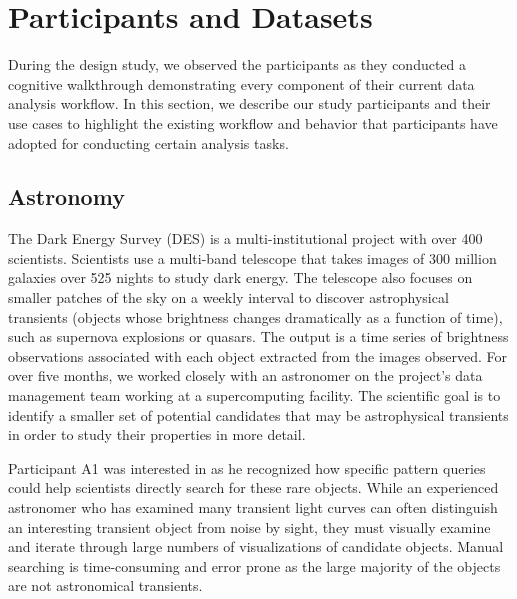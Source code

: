\section{Participants and Datasets}
During the design study, we observed the participants as they conducted a cognitive walkthrough demonstrating every component of their current data analysis workflow. In this section, we describe our study participants and their use cases to highlight the existing workflow and behavior that participants have adopted for conducting certain analysis tasks.
\subsection{Astronomy}
\par The Dark Energy Survey (DES) is a multi-institutional project with over 400 scientists. Scientists use a multi-band telescope that takes images of 300 million galaxies over 525 nights to study dark energy\cite{Drlica-Wagner2017}. The telescope also focuses on smaller patches of the sky on a weekly interval to discover astrophysical transients (objects whose brightness changes dramatically as a function of time), such as supernova explosions or quasars. The output is a time series of brightness observations associated with each object extracted from the images observed. For over five months, we worked closely with an astronomer on the project's data management team working at a supercomputing facility. The scientific goal is to identify a smaller set of potential candidates that may be astrophysical transients in order to study their properties in more detail. 
\par Participant A1 was interested in \zv as he recognized how specific pattern queries could help scientists directly search for these rare objects. While an experienced astronomer who has examined many transient light curves can often distinguish an interesting transient object from noise by sight, they must visually examine and iterate through large numbers of visualizations of candidate objects. Manual searching is time-consuming and error prone as the large majority of the objects are not astronomical transients.

